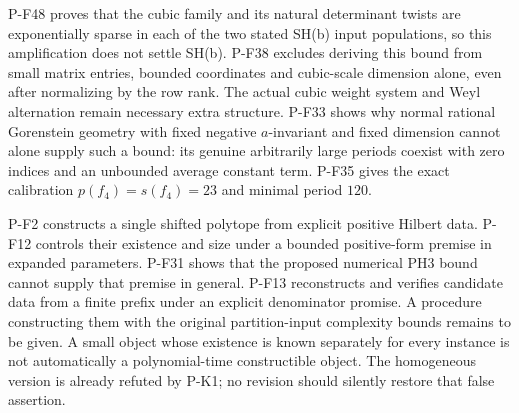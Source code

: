 \begin{description}
P-F48 proves that the cubic family and its natural determinant
twists are exponentially sparse in each of the two stated SH(b)
input populations, so this amplification does not settle SH(b).
P-F38 excludes deriving this bound from small matrix entries, bounded
coordinates and cubic-scale dimension alone, even after normalizing by
the row rank. The actual cubic weight system and Weyl alternation remain
necessary extra structure. P-F33 shows why normal rational Gorenstein geometry with fixed
negative $a$-invariant and fixed dimension cannot alone supply
such a bound: its genuine arbitrarily large periods coexist with
zero indices and an unbounded average constant term. P-F35 gives
the exact calibration $p(f_4)=s(f_4)=23$ and minimal period $120$.

\item[O-COUNT: uniform effective shifted counting.]
P-F2 constructs a single shifted polytope from explicit positive Hilbert
data. P-F12 controls their existence and size under a bounded
positive-form premise in expanded parameters. P-F31 shows that the
proposed numerical PH3 bound cannot supply that premise in general. P-F13 reconstructs
and verifies candidate data from a finite prefix under an explicit
denominator promise. A procedure constructing them with the original
partition-input complexity bounds remains to be given. A small object
whose existence is known separately for every instance is not automatically
a polynomial-time constructible object. The homogeneous version is already
refuted by P-K1; no revision should silently restore that false assertion.


\end{description}
